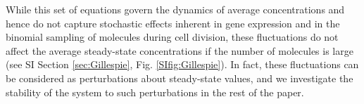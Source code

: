 \documentclass[10pt]{article}
\begin{document}
While this set of equations govern the dynamics of average concentrations and hence do not capture stochastic effects inherent in gene expression and in the binomial sampling of molecules during cell division, these fluctuations do not affect the average steady-state concentrations if the number of molecules is large (see SI Section \ref{sec:Gillespie}, Fig. \ref{SIfig:Gillespie}). In fact, these fluctuations can be considered as perturbations about steady-state values, and we investigate the stability of the system to such perturbations in the rest of the paper. 





\end{document}
